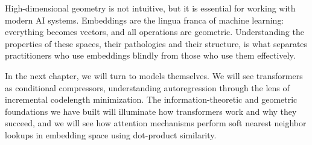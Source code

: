 High-dimensional geometry is not intuitive, but it is essential for working with modern AI systems. Embeddings are the lingua franca of machine learning: everything becomes vectors, and all operations are geometric. Understanding the properties of these spaces, their pathologies and their structure, is what separates practitioners who use embeddings blindly from those who use them effectively.

In the next chapter, we will turn to models themselves. We will see transformers as conditional compressors, understanding autoregression through the lens of incremental codelength minimization. The information-theoretic and geometric foundations we have built will illuminate how transformers work and why they succeed, and we will see how attention mechanisms perform soft nearest neighbor lookups in embedding space using dot-product similarity.
